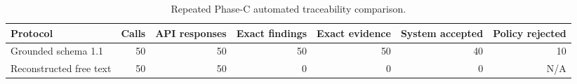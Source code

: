 \begin{table}[htbp]
\centering
\caption{Repeated Phase-C automated traceability comparison.}
\label{tab:llm-repeated}
\small
\begin{adjustbox}{max width=\linewidth}
\begin{tabular}{lrrrrrr}
\toprule
Protocol & Calls & API responses & Exact findings & Exact evidence & System accepted & Policy rejected \\
\midrule
Grounded schema 1.1 & 50 & 50 & 50 & 50 & 40 & 10 \\
Reconstructed free text & 50 & 50 & 0 & 0 & 0 & N/A \\
\bottomrule
\end{tabular}
\end{adjustbox}
\par{}
\par{}
\end{table}
